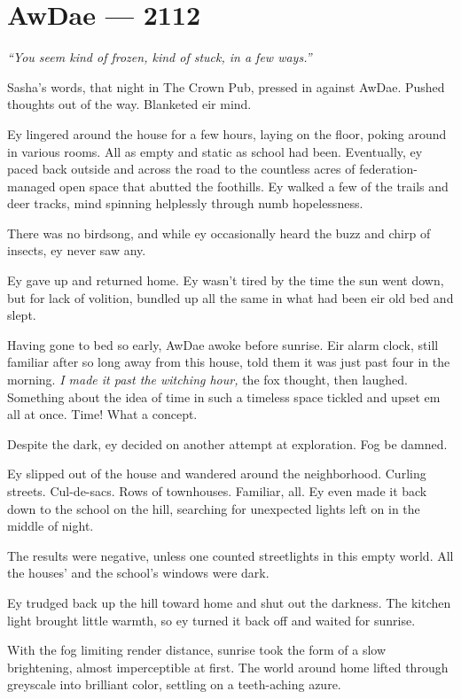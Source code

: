 \hypertarget{rj-brewster-2112}{%
\chapter*{AwDae — 2112}\label{rj-brewster-2112}}

\emph{``You seem kind of frozen, kind of stuck, in a few ways.''}

Sasha's words, that night in The Crown Pub, pressed in against AwDae. Pushed thoughts out of the way. Blanketed eir mind.

Ey lingered around the house for a few hours, laying on the floor, poking around in various rooms. All as empty and static as school had been. Eventually, ey paced back outside and across the road to the countless acres of federation-managed open space that abutted the foothills. Ey walked a few of the trails and deer tracks, mind spinning helplessly through numb hopelessness.

There was no birdsong, and while ey occasionally heard the buzz and chirp of insects, ey never saw any.

Ey gave up and returned home. Ey wasn't tired by the time the sun went down, but for lack of volition, bundled up all the same in what had been eir old bed and slept.

Having gone to bed so early, AwDae awoke before sunrise. Eir alarm clock, still familiar after so long away from this house, told them it was just past four in the morning. \emph{I made it past the witching hour,} the fox thought, then laughed. Something about the idea of time in such a timeless space tickled and upset em all at once. Time! What a concept.

Despite the dark, ey decided on another attempt at exploration. Fog be damned.

Ey slipped out of the house and wandered around the neighborhood. Curling streets. Cul-de-sacs. Rows of townhouses. Familiar, all. Ey even made it back down to the school on the hill, searching for unexpected lights left on in the middle of night.

The results were negative, unless one counted streetlights in this empty world. All the houses' and the school's windows were dark.

Ey trudged back up the hill toward home and shut out the darkness. The kitchen light brought little warmth, so ey turned it back off and waited for sunrise.

With the fog limiting render distance, sunrise took the form of a slow brightening, almost imperceptible at first. The world around home lifted through greyscale into brilliant color, settling on a teeth-aching azure.

